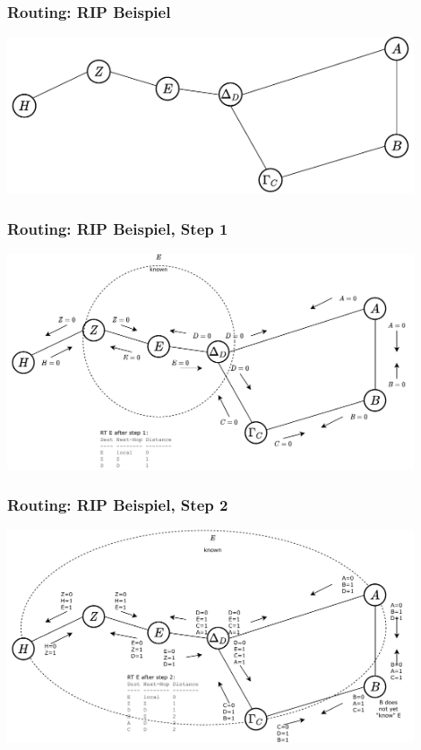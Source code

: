 \documentclass[ignorenonframetext]{beamer}
\begin{document}
\begin{frame}
\frametitle{Routing: RIP Beispiel}
\begin{center}
\includegraphics[width=12cm]{rip-network}
\end{center}
\end{frame}



\begin{frame}
\frametitle{Routing: RIP Beispiel, Step 1}
\begin{center}
\includegraphics[width=12cm]{rip-step-1}
\end{center}
\end{frame}



\begin{frame}
\frametitle{Routing: RIP Beispiel, Step 2}
\begin{center}
\includegraphics[width=12cm]{rip-step-2}
\end{center}
\end{frame}
\end{document}

